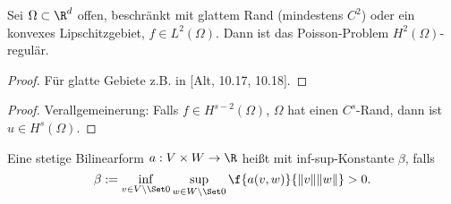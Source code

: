 \begin{st} \label{3.30}
	Sei $\Omega \subset \R^d$ offen, beschränkt mit glattem Rand (mindestens $C^2$) oder ein konvexes Lipschitzgebiet, $f \in L^2(\Omega)$.
	Dann ist das Poisson-Problem $H^2(\Omega)$-regulär.
	\begin{proof}
		Für glatte Gebiete z.B. in [Alt, 10.17, 10.18].
	\end{proof}
	\begin{proof}
		Verallgemeinerung:
		Falls $f \in H^{s-2}(\Omega)$, $\Omega$ hat einen $C^s$-Rand, dann ist $u \in H^s(\Omega)$.
	\end{proof}
\end{st}

\begin{df} \label{3.31}
	Eine stetige Bilinearform $a: V \times W \to \R$ heißt  mit inf-sup-Konstante $\beta$, falls
	\[
		\beta := \inf_{v \in V \setminus \Set 0} \sup_{w \in W \setminus \Set 0} \f{a(v,w)}{\|v\|\|w\|} > 0.
	\]
\end{df}

